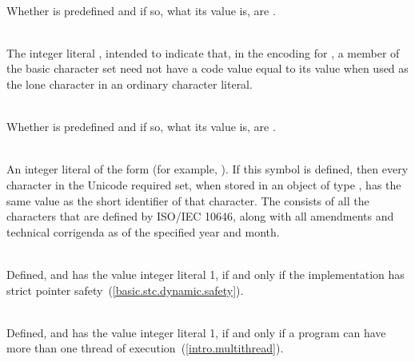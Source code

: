 \begin{description}
\item {}\\
Whether  is predefined and if so, what its value is,
are .

%
%
\item {}\\
The integer literal , intended to indicate that, in the encoding for
, a member of the basic character set need not have a code value equal to
its value when used as the lone character in an ordinary character literal.

%
%
\item {}\\
Whether  is predefined and if so, what its value is,
are .

%
%
\item {}\\
An integer literal of the form  (for example,
).
If this symbol is defined, then every character in the Unicode required set, when
stored in an object of type , has the same value as the short identifier
of that character. The  consists of all
the characters that are defined by ISO/IEC 10646, along with
all amendments and technical corrigenda as of the specified year and month.

%
%
\item {}\\
Defined, and has the value integer literal 1, if and only if the implementation
has strict pointer safety~(\ref{basic.stc.dynamic.safety}).

%
%
\item {}\\
Defined, and has the value integer literal 1, if and only if a program
can have more than one thread of execution~(\ref{intro.multithread}).

\end{description}

